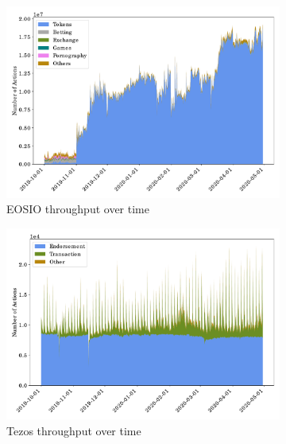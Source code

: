 \begin{figure}[tbp]
    \begin{subfigure}{\columnwidth}
        \centering
        \includegraphics[height=.27\textheight]{./4-transactions-security/figures/eos-chart-area.pdf}
        \caption{EOSIO throughput over time}
        \label{fig:eos-throughput-time}
    \end{subfigure}
    \begin{subfigure}{\columnwidth}
        \centering
        \includegraphics[height=.27\textheight]{./4-transactions-security/figures/tezos-chart-area.pdf}
        \caption{Tezos throughput over time}
        \label{fig:tezos-throughput-time}
    \end{subfigure}
    \begin{subfigure}{\columnwidth}
        \centering

\end{subfigure}
\end{figure}
